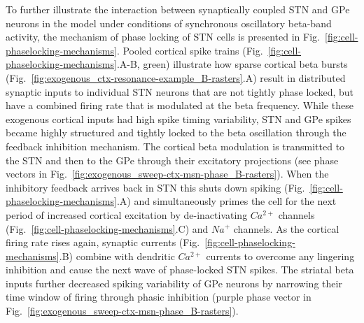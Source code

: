 To further illustrate the interaction between synaptically coupled STN and GPe neurons in the model under conditions of synchronous oscillatory beta-band activity, the mechanism of phase locking of STN cells is presented in Fig.~\ref{fig:cell-phaselocking-mechanisms}. Pooled cortical spike trains (Fig.~\ref{fig:cell-phaselocking-mechanisms}.A-B, green) illustrate how sparse cortical beta bursts (Fig.~\ref{fig:exogenous_ctx-resonance-example_B-rasters}.A) result in distributed synaptic inputs to individual STN neurons that are not tightly phase locked, but have a combined firing rate that is modulated at the beta frequency. While these exogenous cortical inputs had high spike timing variability, STN and GPe spikes became highly structured and tightly locked to the beta oscillation through the feedback inhibition mechanism. The cortical beta modulation is transmitted to the STN and then to the GPe through their excitatory projections (see phase vectors in Fig.~\ref{fig:exogenous_sweep-ctx-msn-phase_B-rasters}). When the inhibitory feedback arrives back in STN this shuts down spiking (Fig.~\ref{fig:cell-phaselocking-mechanisms}.A) and simultaneously primes the cell for the next period of increased cortical excitation by de-inactivating $Ca^{2+}$ channels (Fig.~\ref{fig:cell-phaselocking-mechanisms}.C) and $Na^{+}$ channels. As the cortical firing rate rises again, synaptic currents (Fig.~\ref{fig:cell-phaselocking-mechanisms}.B) combine with dendritic $Ca^{2+}$ currents to overcome any lingering inhibition and cause the next wave of phase-locked STN spikes. The striatal beta inputs further decreased spiking variability of GPe neurons by narrowing their time window of firing through phasic inhibition (purple phase vector in Fig.~\ref{fig:exogenous_sweep-ctx-msn-phase_B-rasters}).

%

